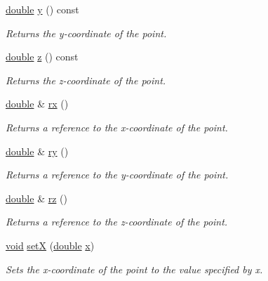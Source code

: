 \begin{DoxyCompactItemize}
\hyperlink{_super_l_u_support_8h_a8956b2b9f49bf918deed98379d159ca7}{double} \hyperlink{class_qwt_point3_d_ac2c90240ee705f3422202aeb6d5e0654}{y} () const 
\begin{DoxyCompactList}\small\item\em Returns the y-\/coordinate of the point. \end{DoxyCompactList}\item 
\hyperlink{_super_l_u_support_8h_a8956b2b9f49bf918deed98379d159ca7}{double} \hyperlink{class_qwt_point3_d_afd56ba68ce1cfad4a4e477f45f0c85d4}{z} () const 
\begin{DoxyCompactList}\small\item\em Returns the z-\/coordinate of the point. \end{DoxyCompactList}\item 
\hyperlink{_super_l_u_support_8h_a8956b2b9f49bf918deed98379d159ca7}{double} \& \hyperlink{class_qwt_point3_d_a99ae15c21e43fac2c4b8755111b03ad0}{rx} ()
\begin{DoxyCompactList}\small\item\em Returns a reference to the x-\/coordinate of the point. \end{DoxyCompactList}\item 
\hyperlink{_super_l_u_support_8h_a8956b2b9f49bf918deed98379d159ca7}{double} \& \hyperlink{class_qwt_point3_d_ab0894c41fdb85dcc7affe38acf33f48d}{ry} ()
\begin{DoxyCompactList}\small\item\em Returns a reference to the y-\/coordinate of the point. \end{DoxyCompactList}\item 
\hyperlink{_super_l_u_support_8h_a8956b2b9f49bf918deed98379d159ca7}{double} \& \hyperlink{class_qwt_point3_d_af76eb9c617ea48ab1050a79bac1d90eb}{rz} ()
\begin{DoxyCompactList}\small\item\em Returns a reference to the z-\/coordinate of the point. \end{DoxyCompactList}\item 
\hyperlink{group___u_a_v_objects_plugin_ga444cf2ff3f0ecbe028adce838d373f5c}{void} \hyperlink{class_qwt_point3_d_afe85919187fd62bc3db082d1e2b17bac}{set\-X} (\hyperlink{_super_l_u_support_8h_a8956b2b9f49bf918deed98379d159ca7}{double} \hyperlink{glext_8h_a1db9d104e3c2128177f26aff7b46982f}{x})
\begin{DoxyCompactList}\small\item\em Sets the x-\/coordinate of the point to the value specified by x. \end{DoxyCompactList}\item 

\end{DoxyCompactItemize}
